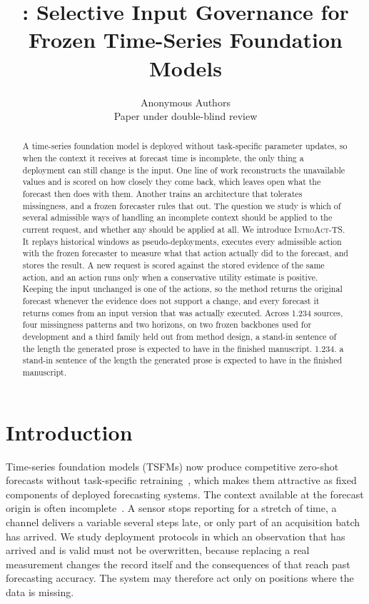 \documentclass{article}
\title{\introact{}: Selective Input Governance for \\
Frozen Time-Series Foundation Models}
\author{Anonymous Authors\\Paper under double-blind review}
\newcommand{\introact}{\textsc{IntroAct-TS}}
\newcommand{\tsfm}{TSFM}
\begin{document}
\maketitle

\begin{abstract}
A time-series foundation model is deployed without task-specific parameter updates, so when the
context it receives at forecast time is incomplete, the only thing a deployment can still
change is the input. One line of work reconstructs the unavailable values and is scored on how closely they come
back, which leaves open what the forecast then does with them. Another trains an architecture
that tolerates missingness, and a frozen forecaster rules that out. The question we study is which of several admissible ways of handling an incomplete
context should be applied to the current request, and whether any should be applied at all. We
introduce \introact{}. It replays historical windows as pseudo-deployments, executes every
admissible action with the frozen forecaster to measure what that action actually did to the
forecast, and stores the result. A new request is scored against the stored evidence of the
same action, and an action runs only when a conservative utility estimate is positive.
Keeping the input unchanged is one of the actions, so the method returns the original forecast
whenever the evidence does not support a change, and every forecast it returns comes from an
input version that was actually executed. Across 1.234 sources, four missingness
patterns and two horizons, on two frozen backbones used for development and a third family
held out from method design, a stand-in sentence of the length the generated prose is expected to have in the finished manuscript. 1.234.
a stand-in sentence of the length the generated prose is expected to have in the finished manuscript.
\end{abstract}

\section{Introduction}
\label{sec:intro}

Time-series foundation models (\tsfm{}s) now produce competitive zero-shot forecasts without
task-specific retraining~\citep{ansari2024chronos,chronosbolt2025,das2024timesfm,woo2024moirai,
chronos2_2025}, which makes them attractive as fixed components of deployed forecasting
systems. The context available at the forecast origin is often
incomplete~\citep{chen2024bitgraph,peng2025s4m}. A sensor stops reporting for a stretch of
time, a channel delivers a variable several steps late, or only part of an acquisition batch
has arrived. We study deployment protocols in which an observation that has arrived and is
valid must not be overwritten, because replacing a real measurement changes the record itself
and the consequences of that reach past forecasting accuracy. The system may therefore act
only on positions where the data is missing.
\end{document}
